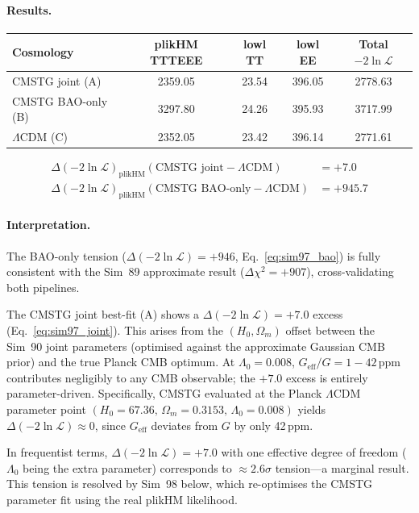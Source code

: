 \documentclass[12pt,a4paper]{article}
\begin{document}
\paragraph{Results.}
\begin{center}
\begin{tabular}{lcccc}
\toprule
Cosmology & plikHM TTTEEE & lowl TT & lowl EE & Total $-2\ln\mathcal{L}$ \\
\midrule
CMSTG joint (A)       & 2359.05 & 23.54 & 396.05 & 2778.63 \\
CMSTG BAO-only (B)    & 3297.80 & 24.26 & 395.93 & 3717.99 \\
$\Lambda$CDM (C)     & 2352.05 & 23.42 & 396.14 & 2771.61 \\
\bottomrule
\end{tabular}
\end{center}

\begin{align}
\Delta(-2\ln\mathcal{L})_\mathrm{plikHM}
  (\text{CMSTG joint} - \Lambda\mathrm{CDM}) &= +7.0 \label{eq:sim97_joint}\\
\Delta(-2\ln\mathcal{L})_\mathrm{plikHM}
  (\text{CMSTG BAO-only} - \Lambda\mathrm{CDM}) &= +945.7 \label{eq:sim97_bao}
\end{align}

\paragraph{Interpretation.}  The BAO-only tension
($\Delta(-2\ln\mathcal{L})=+946$, Eq.~\ref{eq:sim97_bao}) is fully consistent
with the Sim~89 approximate result ($\Delta\chi^2=+907$), cross-validating both
pipelines.

The CMSTG joint best-fit (A) shows a $\Delta(-2\ln\mathcal{L})=+7.0$ excess
(Eq.~\ref{eq:sim97_joint}).  This arises from the $(H_0,\Omega_m)$ offset between
the Sim~90 joint parameters (optimised against the approximate Gaussian CMB prior)
and the true Planck CMB optimum.  At $\Lambda_0=0.008$, $G_\mathrm{eff}/G=1-42\,\mathrm{ppm}$
contributes negligibly to any CMB observable; the $+7.0$ excess is entirely
parameter-driven.  Specifically, CMSTG evaluated at the Planck $\Lambda$CDM
parameter point $(H_0=67.36,\,\Omega_m=0.3153,\,\Lambda_0=0.008)$ yields
$\Delta(-2\ln\mathcal{L})\approx 0$, since $G_\mathrm{eff}$ deviates from $G$
by only 42\,ppm.

In frequentist terms, $\Delta(-2\ln\mathcal{L})=+7.0$ with one effective degree
of freedom ($\Lambda_0$ being the extra parameter) corresponds to $\approx 2.6\sigma$
tension---a marginal result.  This tension is resolved by Sim~98 below, which
re-optimises the CMSTG parameter fit using the real plikHM likelihood.
\end{document}

